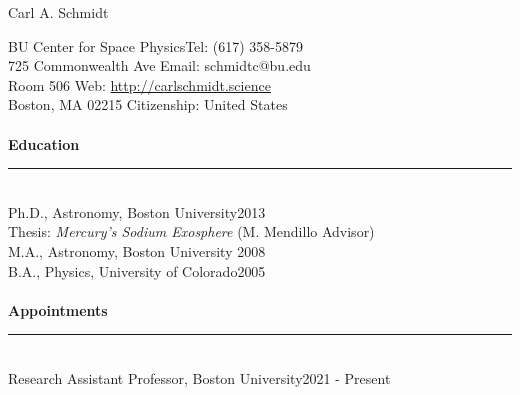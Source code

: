 \documentclass[12pt]{report}
\begin{document}
\newpage  
{\noindent}{\Large Carl A. Schmidt} \\ %
%
%

%
\thispagestyle{myheadings}


\noindent BU Center for Space Physics\hfill Tel: (617) 358-5879\\
725 Commonwealth Ave \hfill Email: schmidtc@bu.edu\\
Room 506 \hfill Web: \url{http://carlschmidt.science}\\
Boston, MA 02215 \hfill Citizenship: United States\\
\vspace{2 mm}\\
\bf{Education}\rm\\
\rule{\textwidth}{1pt}\\
\noindent Ph.D., Astronomy, Boston University\hfill 2013\\
\indent Thesis: {\it Mercury's Sodium Exosphere} (M. Mendillo Advisor)\\
\noindent M.A., Astronomy, Boston University \hfill 2008\\
\noindent B.A., Physics, University of Colorado\hfill 2005\\
\vspace{2 mm}\\
\bf{Appointments}\rm\\
\rule{\textwidth}{1pt}\\
\noindent Research Assistant Professor, Boston University\hfill 2021 - Present\\
\end{document}
